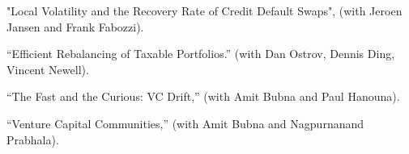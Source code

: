 \documentclass{article}
\begin{document}
\begin{etaremune}
\setlength\itemsep{-0.3em}






\item "Local Volatility and the Recovery Rate of Credit Default Swaps", (with Jeroen Jansen and Frank Fabozzi).

\item ``Efficient Rebalancing of Taxable Portfolios.'' (with Dan Ostrov, Dennis Ding, Vincent Newell). 




\item ``The Fast and the Curious: VC Drift,'' (with Amit Bubna and Paul Hanouna). 


\item ``Venture Capital Communities,'' (with Amit Bubna and Nagpurnanand Prabhala). 













\end{etaremune}
\end{document}
